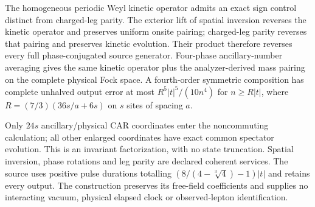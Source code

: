 The homogeneous periodic Weyl kinetic operator admits an exact sign
control distinct from charged-leg parity. The exterior lift of spatial
inversion reverses the kinetic operator and preserves uniform onsite
pairing; charged-leg parity reverses that pairing and preserves kinetic
evolution. Their product therefore reverses every full phase-conjugated
source generator. Four-phase ancillary-number averaging gives the same
kinetic operator plus the analyzer-derived mass pairing on the complete
physical Fock space. A fourth-order symmetric composition has complete
unhalved output error at most $R^5|t|^5/(10n^4)$ for $n\ge R|t|$, where
$R=(7/3)(36s/a+6s)$ on $s$ sites of spacing $a$.

Only $24s$ ancillary/physical CAR coordinates enter the noncommuting
calculation; all other enlarged coordinates have exact common spectator
evolution. This is an invariant factorization, with no state truncation.
Spatial inversion, phase rotations and leg parity are declared coherent
services. The source uses positive pulse durations totalling
$(8/(4-\sqrt[3]{4})-1)|t|$ and retains every output. The construction
preserves its free-field coefficients and supplies no interacting vacuum,
physical elapsed clock or observed-lepton identification.
